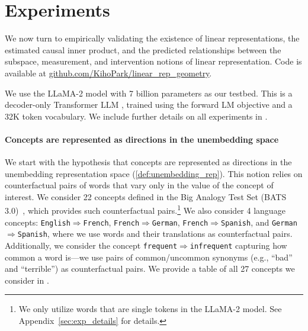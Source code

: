 \documentclass{article}
\theoremstyle{plain}
\theoremstyle{definition}
\theoremstyle{remark}
\newcommand{\ConceptDirName}[2]{\texttt{#1$\Rightarrow$#2}}
\begin{document}
\section{Experiments}
We now turn to empirically validating the existence of linear representations, the estimated causal inner product, and the predicted relationships between the subspace, measurement, and intervention notions of linear representation.
Code is available at \href{https://github.com/KihoPark/linear_rep_geometry}{github.com/KihoPark/linear\_rep\_geometry}.

We use the LLaMA-2 model with 7 billion parameters \citep{touvron2023llama2} as our testbed.
This is a decoder-only Transformer LLM \citep{vaswani2017attention,radford2018improving}, 
trained using the forward LM objective and a 32K token vocabulary.
We include further details on all experiments in .

\paragraph{Concepts are represented as directions in the unembedding space}\label{sec:exp_subspace}
We start with the hypothesis that concepts are represented as directions in the unembedding representation space (\cref{def:unembedding_rep}).
This notion relies on counterfactual pairs of words that vary only in the value of the concept of interest.
We consider 22 concepts defined in the Big Analogy Test Set (BATS 3.0)~\citep{gladkova2016analogy}, which provides such counterfactual pairs.\footnote{We only utilize words that are single tokens in the LLaMA-2 model. See Appendix~\ref{sec:exp_details} for details.}
We also consider 4 language concepts: \ConceptDirName{English}{French}, \ConceptDirName{French}{German}, \ConceptDirName{French}{Spanish}, and \ConceptDirName{German}{Spanish}, where we use words and their translations as counterfactual pairs. 
Additionally, we consider the concept \ConceptDirName{frequent}{infrequent} capturing how common a word is---we use pairs of common/uncommon synonyms (e.g., ``bad'' and ``terrible'') as counterfactual pairs.
We provide a table of all 27 concepts we consider in .
\end{document}
